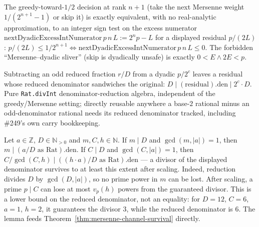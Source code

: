 \begin{lem}
\label{lem:dyadic-excess-reformulation}
The greedy-toward-$1/2$ decision at rank $n{+}1$ (take the next Mersenne weight
$1/(2^{n+1}-1)$ or skip it) is exactly equivalent, with no real-analytic approximation, to
an integer sign test on the excess numerator $\mathrm{nextDyadicExcessIntNumerator}\,p\,n\,L
:= 2^n p - L$ for a displayed residual $p/(2L)$: $p/(2L)\le 1/2^{n+1} \iff
\mathrm{nextDyadicExcessIntNumerator}\,p\,n\,L\le 0$. The forbidden ``Mersenne--dyadic
sliver'' (skip is dyadically unsafe) is exactly $0<E\land 2E<p$.
\par{}
\end{lem}

\begin{lem}
\label{lem:denominator-sandwich}
Subtracting an odd reduced fraction $r/D$ from a dyadic $p/2^c$ leaves a residual whose
reduced denominator sandwiches the original: $D\mid(\mathrm{residual}).\mathrm{den}\mid
2^c\cdot D$. Pure \texttt{Rat.divInt} denominator-reduction algebra, independent of the
greedy/Mersenne setting; directly reusable anywhere a base-$2$ rational minus an
odd-denominator rational needs its reduced denominator tracked, including \#249's own
carry bookkeeping.
\par{}
\end{lem}

\begin{lem}
\label{lem:denominator-survival}
Let $a\in\mathbb Z$, $D\in\mathbb N_{>0}$ and $m,C,h\in\mathbb N$.
If $m\mid D$ and $\gcd(m,|a|)=1$, then $m\mid(a/D\text{ as }
\mathrm{Rat}).\mathrm{den}$. If $C\mid D$ and $\gcd(C,|a|)=1$, then
$C/\gcd(C,h)\mid((h\cdot a)/D\text{ as }\mathrm{Rat}).\mathrm{den}$ — a divisor of the
displayed denominator survives to at least this extent after scaling.
Indeed, reduction divides $D$ by $\gcd(D,|a|)$, so no prime power in $m$
can be lost. After scaling, a prime $p\mid C$ can lose at most $v_p(h)$
powers from the guaranteed divisor. This is a lower bound on the reduced
denominator, not an equality: for $D=12$, $C=6$, $a=1$, $h=2$, it guarantees
the divisor $3$, while the reduced denominator is $6$.
The lemma feeds Theorem~\ref{thm:mersenne-channel-survival} directly.
\par{}
\end{lem}

